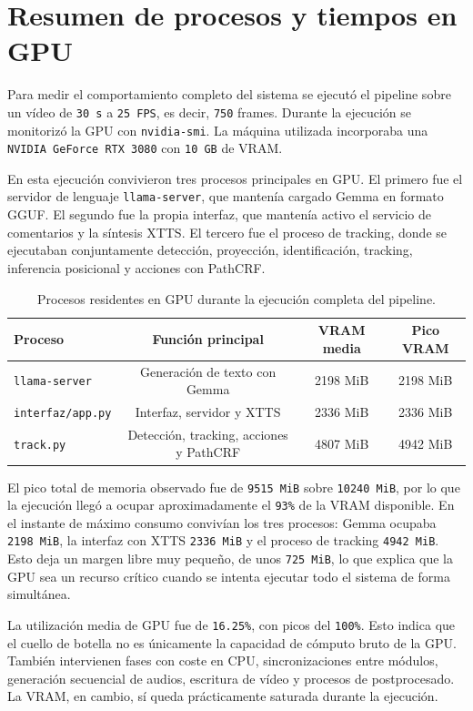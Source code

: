 \section{Resumen de procesos y tiempos en GPU}

Para medir el comportamiento completo del sistema se ejecutó el pipeline sobre un vídeo de \texttt{30 s} a \texttt{25 FPS}, es decir, \texttt{750} frames. Durante la ejecución se monitorizó la GPU con \texttt{nvidia-smi}. La máquina utilizada incorporaba una \texttt{NVIDIA GeForce RTX 3080} con \texttt{10 GB} de VRAM.

En esta ejecución convivieron tres procesos principales en GPU. El primero fue el servidor de lenguaje \texttt{llama-server}, que mantenía cargado Gemma en formato GGUF. El segundo fue la propia interfaz, que mantenía activo el servicio de comentarios y la síntesis XTTS. El tercero fue el proceso de tracking, donde se ejecutaban conjuntamente detección, proyección, identificación, tracking, inferencia posicional y acciones con PathCRF.

\begin{table}[ht]
\centering
\small
\begin{tabular}{lccc}
\toprule
Proceso & Función principal & VRAM media & Pico VRAM \\
\midrule
\texttt{llama-server} & Generación de texto con Gemma & 2198 MiB & 2198 MiB \\
\texttt{interfaz/app.py} & Interfaz, servidor y XTTS & 2336 MiB & 2336 MiB \\
\texttt{track.py} & Detección, tracking, acciones y PathCRF & 4807 MiB & 4942 MiB \\
\bottomrule
\end{tabular}
\caption{Procesos residentes en GPU durante la ejecución completa del pipeline.}
\end{table}

El pico total de memoria observado fue de \texttt{9515 MiB} sobre \texttt{10240 MiB}, por lo que la ejecución llegó a ocupar aproximadamente el \texttt{93\%} de la VRAM disponible. En el instante de máximo consumo convivían los tres procesos: Gemma ocupaba \texttt{2198 MiB}, la interfaz con XTTS \texttt{2336 MiB} y el proceso de tracking \texttt{4942 MiB}. Esto deja un margen libre muy pequeño, de unos \texttt{725 MiB}, lo que explica que la GPU sea un recurso crítico cuando se intenta ejecutar todo el sistema de forma simultánea.

La utilización media de GPU fue de \texttt{16.25\%}, con picos del \texttt{100\%}. Esto indica que el cuello de botella no es únicamente la capacidad de cómputo bruto de la GPU. También intervienen fases con coste en CPU, sincronizaciones entre módulos, generación secuencial de audios, escritura de vídeo y procesos de postprocesado. La VRAM, en cambio, sí queda prácticamente saturada durante la ejecución.

